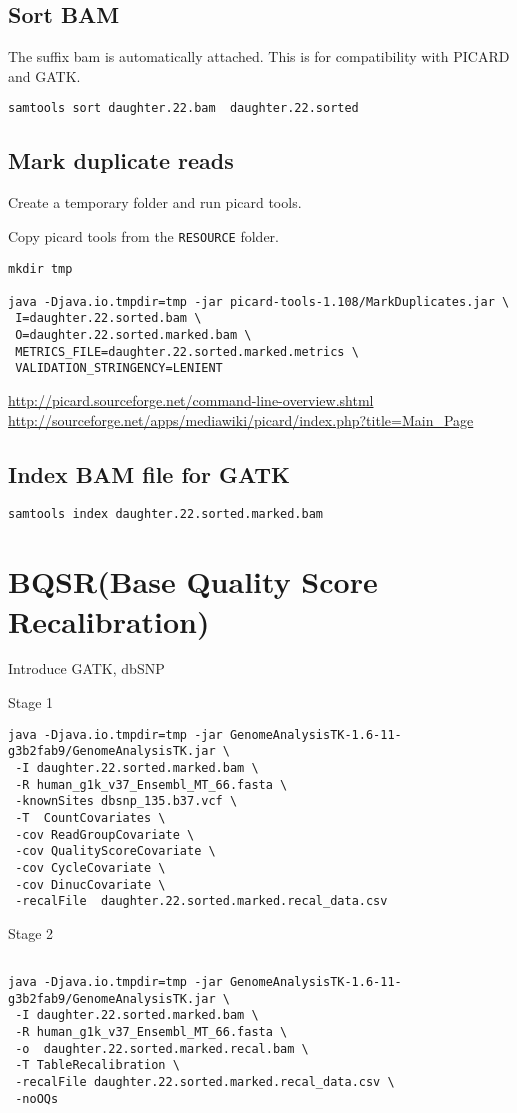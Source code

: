 \documentclass{article}
\begin{document}
\subsection{Sort BAM}
The suffix bam is automatically attached. This is for compatibility with PICARD and GATK.

\begin{verbatim}
samtools sort daughter.22.bam  daughter.22.sorted 
\end{verbatim}

\subsection{Mark duplicate reads}

Create a temporary folder and run picard tools.

Copy picard tools from the \verb+RESOURCE+ folder.
\begin{verbatim}
mkdir tmp

java -Djava.io.tmpdir=tmp -jar picard-tools-1.108/MarkDuplicates.jar \
 I=daughter.22.sorted.bam \
 O=daughter.22.sorted.marked.bam \
 METRICS_FILE=daughter.22.sorted.marked.metrics \
 VALIDATION_STRINGENCY=LENIENT

\end{verbatim}        
\url{http://picard.sourceforge.net/command-line-overview.shtml}
\url{http://sourceforge.net/apps/mediawiki/picard/index.php?title=Main_Page}

\subsection{Index BAM file for GATK}
\begin{verbatim}
samtools index daughter.22.sorted.marked.bam
\end{verbatim}


\section{BQSR(Base Quality Score Recalibration)}

Introduce GATK, dbSNP

Stage 1
\begin{verbatim}
java -Djava.io.tmpdir=tmp -jar GenomeAnalysisTK-1.6-11-g3b2fab9/GenomeAnalysisTK.jar \
 -I daughter.22.sorted.marked.bam \
 -R human_g1k_v37_Ensembl_MT_66.fasta \
 -knownSites dbsnp_135.b37.vcf \
 -T  CountCovariates \
 -cov ReadGroupCovariate \
 -cov QualityScoreCovariate \
 -cov CycleCovariate \
 -cov DinucCovariate \
 -recalFile  daughter.22.sorted.marked.recal_data.csv 
\end{verbatim}
Stage 2
\begin{verbatim}
 
java -Djava.io.tmpdir=tmp -jar GenomeAnalysisTK-1.6-11-g3b2fab9/GenomeAnalysisTK.jar \
 -I daughter.22.sorted.marked.bam \
 -R human_g1k_v37_Ensembl_MT_66.fasta \
 -o  daughter.22.sorted.marked.recal.bam \
 -T TableRecalibration \
 -recalFile daughter.22.sorted.marked.recal_data.csv \
 -noOQs
 \end{verbatim}
 
\end{document}
